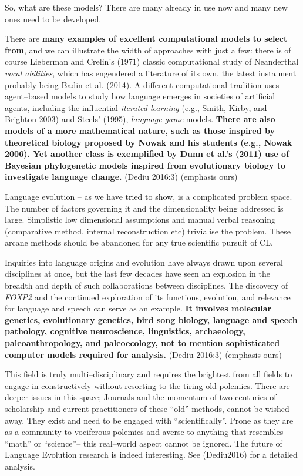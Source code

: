 So, what are these models? There are many already in use now and many new ones need to be developed.

\begin{myquote}
There are \textbf{many examples of excellent computational models to select from}, and we can illustrate the width of approaches with just a few: there is of course Lieberman and Crelin’s (1971) classic computational study of Neanderthal \textit{vocal abilities}, which has engendered a literature of its own, the latest instalment probably being Badin et al. (2014). A different computational tradition uses agent–based models to study how language emerges in societies of artificial agents, including the influential \textit{iterated learning} (e.g., Smith, Kirby, and Brighton 2003) and Steels’ (1995), \textit{language game} models. \textbf{There are also models of a more mathematical nature, such as those inspired by theoretical biology proposed by Nowak and his students (e.g., Nowak 2006). Yet another class is exemplified by Dunn et al.’s (2011) use of Bayesian phylogenetic models inspired from evolutionary biology to investigate language change.} (Dediu 2016:3) (emphasis ours)
\end{myquote}

Language evolution – as we have tried to show, is a complicated problem space. The number of factors governing it and the dimensionality being addressed is large. Simplistic low dimensional assumptions and manual verbal reasoning (comparative method, internal reconstruction etc) trivialise the problem. These arcane methods should be abandoned for any true scientific pursuit of CL.

\begin{myquote}
Inquiries into language origins and evolution have always drawn upon several disciplines at once, but the last few decades have seen an explosion in the breadth and depth of such collaborations between disciplines. The discovery of \textit{FOXP2} and the continued exploration of its functions, evolution, and relevance for language and speech can serve as an example. \textbf{It involves molecular genetics, evolutionary genetics, bird song biology, language and speech pathology, cognitive neuroscience, linguistics, archaeology, paleoanthropology, and paleoecology, not to mention sophisticated computer models required for analysis.} (Dediu 2016:3) (emphasis ours)
\end{myquote}

This field is truly multi–disciplinary and requires the brightest from all fields to engage in constructively without resorting to the tiring old polemics. There are deeper issues in this space; Journals and the momentum of two centuries of scholarship and current practitioners of these “old” methods, cannot be wished away. They exist and need to be engaged with “scientifically”. Prone as they are as a community to vociferous polemics and averse to anything that resembles “math” or “science”– this real–world aspect cannot be ignored. The future of Language Evolution research is indeed interesting. See (Dediu2016) for a detailed analysis.


